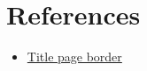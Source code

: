 \documentclass{report}
\begin{document}
\pagestyle{fancy}
\setlength{\headheight}{0.5cm}
\fancyhf{}





\Large
\tableofcontents
\thispagestyle{fancy} %
\vfill
\pagebreak





\renewcommand\thesection{\arabic{section}} %
\renewcommand\thesubsection{\thesection.\arabic{subsection}} %
\renewcommand\thesubsubsection{\alph{subsubsection}} 





\section{References}
\begin{itemize}
    \item \href{https://tex.stackexchange.com/questions/407812/page-border-for-cover-page-in-latex}{Title page border}
\end{itemize}
\end{document}

